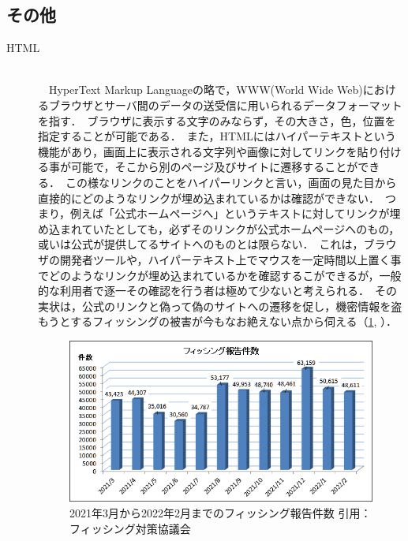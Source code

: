 \documentclass[dvipdfmx]{jsarticle}
\begin{document}
        \subsection{その他}
            \begin{description}
                \item[HTML]\mbox{}\\
                    　HyperText Markup Languageの略で，WWW(World Wide Web)におけるブラウザとサーバ間のデータの送受信に用いられるデータフォーマットを指す．\
                    ブラウザに表示する文字のみならず，その大きさ，色，位置を指定することが可能である．\
                    また，HTMLにはハイパーテキストという機能があり，画面上に表示される文字列や画像に対してリンクを貼り付ける事が可能で，そこから別のページ及びサイトに遷移することができる\cite{AboutHTML}．\
                    この様なリンクのことをハイパーリンクと言い，画面の見た目から直接的にどのようなリンクが埋め込まれているかは確認ができない．\
                    つまり，例えば「公式ホームページへ」というテキストに対してリンクが埋め込まれていたとしても，必ずそのリンクが公式ホームページへのもの，或いは公式が提供してるサイトへのものとは限らない．\
                    これは，ブラウザの開発者ツールや，ハイパーテキスト上でマウスを一定時間以上置く事でどのようなリンクが埋め込まれているかを確認するこができるが，一般的な利用者で逐一その確認を行う者は極めて少ないと考えられる．\
                    その実状は，公式のリンクと偽って偽のサイトへの遷移を促し，機密情報を盗もうとするフィッシングの被害が今もなお絶えない点から伺える（\ref{fishing}, \cite{Fishing}）．\
                    \begin{figure}[h]
                        \centering
                        \includegraphics[width=15cm]{img/fishing.png}
                        \caption{2021年3月から2022年2月までのフィッシング報告件数 引用：フィッシング対策協議会}
                        \label{fishing}
                    \end{figure}
            \end{description}
\end{document}

